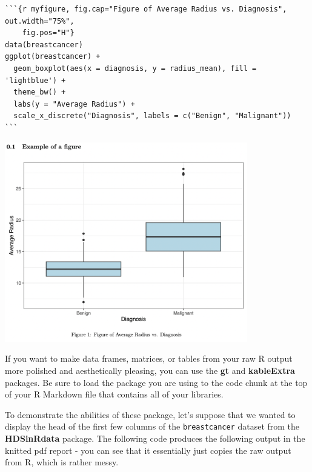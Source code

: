 \documentclass[
  letterpaper,
]{krantz}
\begin{document}
\begin{verbatim}
```{r myfigure, fig.cap="Figure of Average Radius vs. Diagnosis", out.width="75%", 
    fig.pos="H"}
data(breastcancer)
ggplot(breastcancer) + 
  geom_boxplot(aes(x = diagnosis, y = radius_mean), fill = 'lightblue') +
  theme_bw() + 
  labs(y = "Average Radius") + 
  scale_x_discrete("Diagnosis", labels = c("Benign", "Malignant"))
```
\end{verbatim}

\begin{center}
\includegraphics[width=4.16667in,height=\textheight]{book/images/rmarkdown_reports/example-figure.png}
\end{center}

If you want to make data frames, matrices, or tables from your raw R
output more polished and aesthetically pleasing, you can use the
\textbf{gt} and \textbf{kableExtra} packages. Be sure to load the
package you are using to the code chunk at the top of your R Markdown
file that contains all of your libraries.

To demonstrate the abilities of these package, let's suppose that we
wanted to display the head of the first few columns of the
\texttt{breastcancer} dataset from the \textbf{HDSinRdata} package. The
following code produces the following output in the knitted pdf report -
you can see that it essentially just copies the raw output from R, which
is rather messy.
\end{document}
